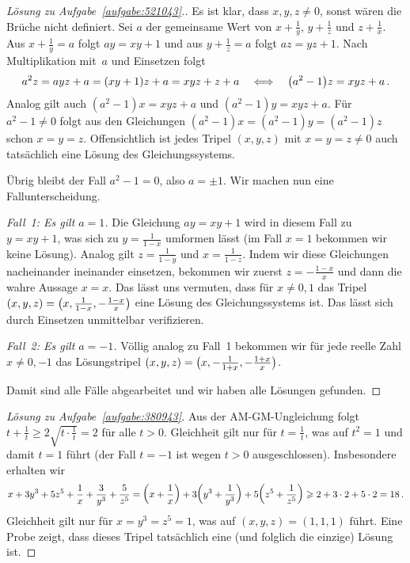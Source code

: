 \begin{proof}[Lösung zu Aufgabe~\ref{aufgabe:521043}.]
	Es ist klar, dass $x,y,z\neq 0$, sonst wären die Brüche nicht definiert. Sei $a$ der gemeinsame Wert von $x+\frac 1y$, $y+\frac 1z$ und $z+\frac 1x$. Aus $x+\frac 1y=a$ folgt $ay=xy+1$ und aus $y+\frac 1z=a$ folgt $az=yz+1$. Nach Multiplikation mit~$a$ und Einsetzen folgt
	\begin{equation*}
		a^2z=ayz+a=(xy+1)z+a=xyz+z+a\quad\Longleftrightarrow \quad\parens*{a^2-1}z=xyz+a\,.
	\end{equation*}
	Analog gilt auch $(a^2-1)x=xyz+a$ und $(a^2-1)y=xyz+a$. Für $a^2-1\neq 0$ folgt aus den Gleichungen $(a^2-1)x=(a^2-1)y=(a^2-1)z$ schon $x=y=z$. Offensichtlich ist jedes Tripel $(x,y,z)$ mit $x=y=z\neq 0$ auch tatsächlich eine Lösung des Gleichungssystems.
	
	Übrig bleibt der Fall $a^2-1=0$, also $a=\pm 1$. Wir machen nun eine Fallunterscheidung.
	
	\emph{Fall~1: Es gilt $a=1$.} Die Gleichung $ay=xy+1$ wird in diesem Fall zu $y=xy+1$, was sich zu $y=\frac{1}{1-x}$ umformen lässt (im Fall $x=1$ bekommen wir keine Lösung). Analog gilt $z=\frac{1}{1-y}$ und $x=\frac{1}{1-z}$. Indem wir diese Gleichungen nacheinander ineinander einsetzen, bekommen wir zuerst $z=-\frac{1-x}{x}$ und dann die wahre Aussage $x=x$. Das lässt uns vermuten, dass für $x\neq 0,1$ das Tripel $(x,y,z)=\parens[\big]{x,\frac{1}{1-x},-\frac{1-x}{x}}$ eine Lösung des Gleichungssystems ist. Das lässt sich durch Einsetzen unmittelbar verifizieren.
	
	
	\emph{Fall~2: Es gilt $a=-1$.} Völlig analog zu Fall~1 bekommen wir für jede reelle Zahl $x\neq 0,-1$ das Lösungstripel $(x,y,z)=\parens[\big]{x,-\frac{1}{1+x},-\frac{1+x}{x}}$.
	
	Damit sind alle Fälle abgearbeitet und wir haben alle Lösungen gefunden.
\end{proof}
\begin{proof}[Lösung zu Aufgabe~\ref{aufgabe:380943}]
	Aus der AM-GM-Ungleichung folgt $t+\frac 1t\geqslant 2\sqrt{t\cdot\frac 1t}=2$ für alle $t>0$. Gleichheit gilt nur für $t=\frac 1t$, was auf $t^2=1$ und damit $t=1$ führt (der Fall $t=-1$ ist wegen $t>0$ ausgeschlossen). Insbesondere erhalten wir
	\begin{equation*}
		x+3y^3+5z^5+\frac 1x+\frac3{y^3}+\frac5{z^5}=\parens*{x+\frac 1x}+3\parens*{y^3+\frac1{y^3}}+5\parens*{z^5+\frac1{z^5}}\geqslant 2+3\cdot 2+5\cdot 2=18\,.
	\end{equation*}
	Gleichheit gilt nur für $x=y^3=z^5=1$, was auf $(x,y,z)=(1,1,1)$ führt. Eine Probe zeigt, dass dieses Tripel tatsächlich eine (und folglich die einzige) Lösung ist.
\end{proof}
